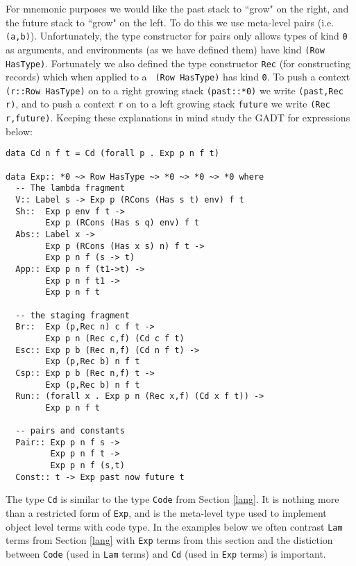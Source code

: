 \documentclass{sigplanconf}
\begin{document}
For mnemonic purposes we would like the past stack to ``grow" on the right, and
the future stack to ``grow" on the left. To do this we use meta-level pairs
(i.e. {\tt (a,b)}). Unfortunately, the type constructor for pairs only allows
types of kind {\tt *0} as arguments, and environments (as we have defined
them) have kind {\tt (Row HasType)}. Fortunately we also defined the type
constructor {\tt Rec} (for constructing records) which when applied to a {\tt
(Row HasType)} has kind {\tt *0}. To push a context {\tt (r::Row HasType)} on
to a right growing stack {\tt (past::*0)} we write {\tt (past,Rec r)}, and to push a
context {\tt r} on to a left growing stack {\tt future} we write {\tt (Rec r,future)}.
Keeping these explanations in mind study the GADT for expressions below:
\begin{verbatim}
data Cd n f t = Cd (forall p . Exp p n f t)

data Exp:: *0 ~> Row HasType ~> *0 ~> *0 ~> *0 where 
  -- The lambda fragment
  V:: Label s -> Exp p (RCons (Has s t) env) f t
  Sh::  Exp p env f t -> 
        Exp p (RCons (Has s q) env) f t
  Abs:: Label x -> 
        Exp p (RCons (Has x s) n) f t -> 
        Exp p n f (s -> t)
  App:: Exp p n f (t1->t) -> 
        Exp p n f t1 -> 
        Exp p n f t
  
  -- the staging fragment
  Br::  Exp (p,Rec n) c f t -> 
        Exp p n (Rec c,f) (Cd c f t)
  Esc:: Exp p b (Rec n,f) (Cd n f t) -> 
        Exp (p,Rec b) n f t
  Csp:: Exp p b (Rec n,f) t -> 
        Exp (p,Rec b) n f t
  Run:: (forall x . Exp p n (Rec x,f) (Cd x f t)) -> 
        Exp p n f t
  
  -- pairs and constants
  Pair:: Exp p n f s -> 
         Exp p n f t -> 
         Exp p n f (s,t)
  Const:: t -> Exp past now future t
\end{verbatim}
The type {\tt Cd} is similar to the type {\tt Code} from
Section \ref{lang}. It is nothing more than a restricted form
of {\tt Exp}, and is the meta-level type used to implement
object level terms with code type. In the examples below
we often contrast {\tt Lam} terms from Section \ref{lang}
with {\tt Exp} terms from this section and the distiction
between {\tt Code} (used in {\tt Lam} terms) and {\tt Cd} (used in {\tt Exp}
terms) is important.
\end{document}

